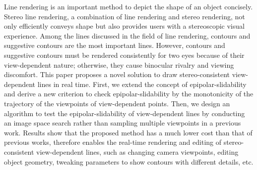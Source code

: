 \begin{englishabstract}

Line rendering is an important method to depict the shape of an object concisely. Stereo line rendering, a combination of line rendering and stereo rendering, not only efficiently conveys shape but also provides users with a stereoscopic visual experience. Among the lines discussed in the field of line rendering, contours and suggestive contours are the most important lines. However, contours and suggestive contours must be rendered consistently for two eyes because of their view-dependent nature; otherwise, they cause binocular rivalry and viewing discomfort. This paper proposes a novel solution to draw stereo-consistent view-dependent lines in real time. First, we extend the concept of epipolar-slidability and derive a new criterion to check epipolar-slidability by the monotonicity of the trajectory of the viewpoints of view-dependent points. Then, we design an algorithm to test the epipolar-slidability of view-dependent lines by conducting an image space search rather than sampling multiple viewpoints in a previous work. Results show that the proposed method has a much lower cost than that of previous works, therefore enables the real-time rendering and editing of stereo-consistent view-dependent lines, such as changing camera viewpoints, editing object geometry, tweaking parameters to show contours with different details, etc.


\end{englishabstract}
